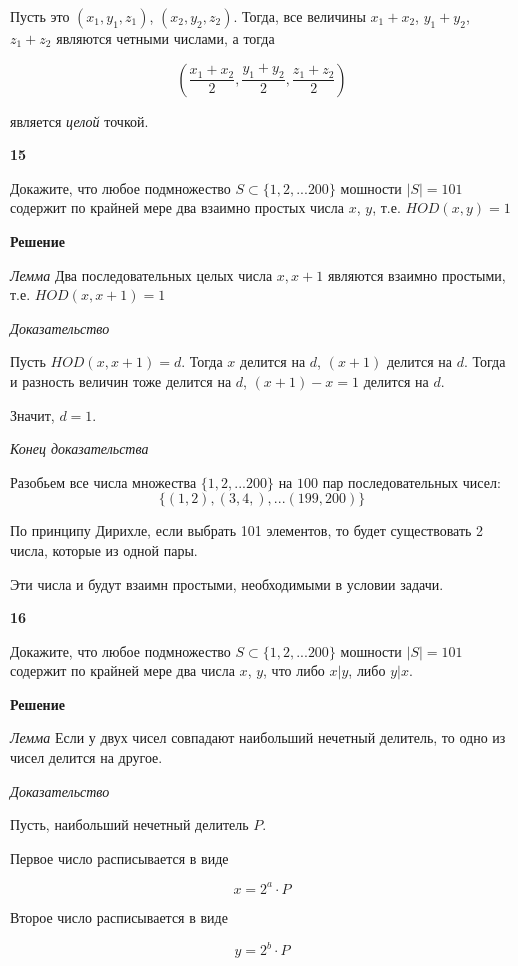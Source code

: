 \documentclass{article}
\begin{document}
Пусть это $(x_1, y_1, z_1)$, $(x_2, y_2, z_2)$. Тогда, все величины $x_1 + x_2$, $y_1 + y_2$, $z_1 + z_2$  являются четными числами, а тогда

$$\left(\frac{x_1 + x_2}{2}, \frac{y_1 + y_2}{2}, \frac{z_1 + z_2}{2}\right)$$

является \textit{целой} точкой.

\newpage

\textbf{15}

Докажите, что любое подмножество $S \subset \{1, 2, ... 200\}$ мошности $|S | = 101$ содержит по крайней мере два взаимно простых числа $x$, $y$, т.е. $HOD(x, y) = 1$ 

\textbf{Решение}

\textit{Лемма}
Два последовательных целых числа $x, x + 1$ являются взаимно простыми,  т.е. $HOD(x, x + 1) = 1$

\textit{Доказательство}

Пусть $HOD(x, x + 1) = d$. Тогда $x$  делится на $d$, $(x + 1)$ делится на $d$. Тогда и разность величин тоже делится на $d$, $(x + 1) - x = 1$ делится на $d$. 

Значит, $d = 1$.

\textit{Конец доказательства}

Разобьем все числа множества $\{1, 2, ... 200\}$  на $100$ пар последовательных чисел: 
$$ \{ (1, 2), (3, 4,), ... (199, 200) \}$$

По принципу Дирихле, если выбрать 101 элементов, то будет существовать 2 числа, которые из одной пары. 

Эти числа и будут взаимн простыми, необходимыми в условии задачи.

\newpage

\textbf{16}

Докажите, что любое подмножество $S \subset \{1, 2, ... 200\}$ мошности $|S | = 101$ содержит по крайней мере два числа $x$, $y$, что либо $x | y$, либо $y | x$.

\textbf{Решение}


\textit{Лемма}
Если у двух чисел совпадают наибольший нечетный делитель, то одно из чисел делится на другое. 

\textit{Доказательство}

Пусть, наибольший нечетный делитель $P$.

Первое число расписывается в виде 

$$x = 2^a \cdot P$$

Второе число расписывается в виде

$$y = 2 ^ b \cdot P$$
\end{document}
